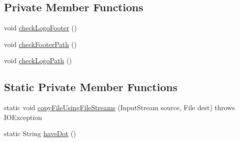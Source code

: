 \subsection*{Private Member Functions}
\begin{DoxyCompactItemize}
\item 
void \hyperlink{classit_1_1isislab_1_1masonassisteddocumentation_1_1mason_1_1analizer_1_1_global_utility_ae0228c980431c4886cc35015ecedb219}{check\-Logo\-Footer} ()
\item 
void \hyperlink{classit_1_1isislab_1_1masonassisteddocumentation_1_1mason_1_1analizer_1_1_global_utility_a461e0b0204d6c69a4126947190ca85ef}{check\-Footer\-Path} ()
\item 
void \hyperlink{classit_1_1isislab_1_1masonassisteddocumentation_1_1mason_1_1analizer_1_1_global_utility_a66a1a8d4779245f596a65fd8d95362b2}{check\-Logo\-Path} ()
\end{DoxyCompactItemize}
\subsection*{Static Private Member Functions}
\begin{DoxyCompactItemize}
\item 
static void \hyperlink{classit_1_1isislab_1_1masonassisteddocumentation_1_1mason_1_1analizer_1_1_global_utility_adb83aee7a7166b3826c7f3cf4ada53a9}{copy\-File\-Using\-File\-Streams} (Input\-Stream source, File dest)  throws I\-O\-Exception 
\item 
static String \hyperlink{classit_1_1isislab_1_1masonassisteddocumentation_1_1mason_1_1analizer_1_1_global_utility_a396066731dbc923fe85d28988511ba46}{have\-Dot} ()
\end{DoxyCompactItemize}
